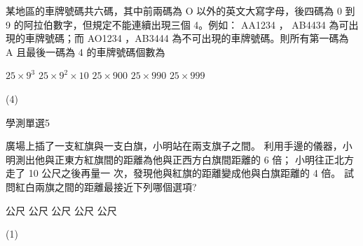 \begin{QUESTIONS}
\begin{QUESTION}
\begin{ExamAnsRateInfo}{39}{69}{31}{17}
        \end{ExamAnsRateInfo}
        \begin{QBODY}
            某地區的車牌號碼共六碼，其中前兩碼為 O 以外的英文大寫字母，後四碼為 0 到 9 的阿拉伯數字，但規定不能連續出現三個 4。例如： AA1234 ， AB4434 為可出現的車牌號碼；而 AO1234 ，AB3444 為不可出現的車牌號碼。則所有第一碼為 A 且最後一碼為 4 的車牌號碼個數為 
			\begin{QOPS}
				\QOP $25 \times 9^3$ 
				\QOP $25\times 9^2 \times 10$        
				\QOP $25 \times 900$
				\QOP $25 \times 990$ 
				\QOP $25 \times 999$ 
			\end{QOPS}
        \end{QBODY}
        \begin{QFROMS}
        \end{QFROMS}
        \begin{QTAGS}\end{QTAGS}
        \begin{QANS}
            (4)
        \end{QANS}
        \begin{QSOLLIST}
        \end{QSOLLIST}
        \begin{QEMPTYSPACE}
        \end{QEMPTYSPACE}
    \end{QUESTION}
    \begin{QUESTION}
        \begin{ExamInfo}{97}{學測}{單選}{5}
        \end{ExamInfo}
        \begin{ExamAnsRateInfo}{41}{74}{32}{17}
        \end{ExamAnsRateInfo}
        \begin{QBODY}
            廣場上插了一支紅旗與一支白旗，小明站在兩支旗子之間。		利用手邊的儀器，小明測出他與正東方紅旗間的距離為他與正西方白旗間距離的 6 倍；			小明往正北方走了 10 公尺之後再量一 次，發現他與紅旗的距離變成他與白旗距離的 4 倍。			試問紅白兩旗之間的距離最接近下列哪個選項?
			\begin{QOPS} 
				\QOP 60 公尺 
				\QOP 65 公尺    
				\QOP 70 公尺 
				\QOP 75 公尺 
				\QOP 80 公尺
			\end{QOPS}
        \end{QBODY}
        \begin{QFROMS}
        \end{QFROMS}
        \begin{QTAGS}\end{QTAGS}
        \begin{QANS}
            (1)
        \end{QANS}
        \begin{QSOLLIST}
        \end{QSOLLIST}
        \begin{QEMPTYSPACE}
        \end{QEMPTYSPACE}
    \end{QUESTION}
\end{QUESTIONS}
